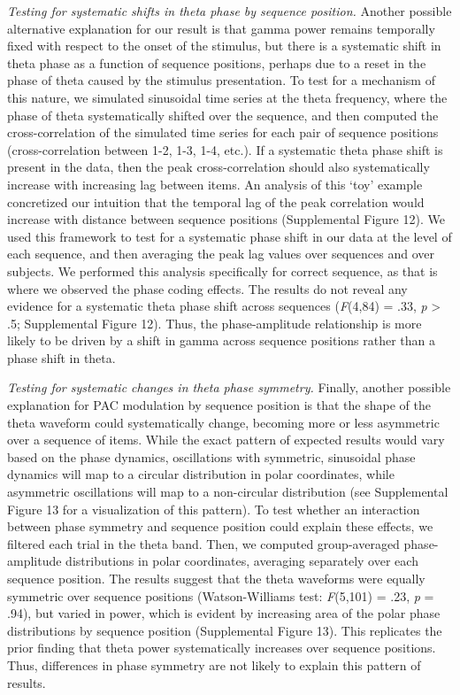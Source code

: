 \emph{Testing for systematic shifts in theta phase by sequence
position.} Another possible alternative explanation for our result is
that gamma power remains temporally fixed with respect to the onset of
the stimulus, but there is a systematic shift in theta phase as a
function of sequence positions, perhaps due to a reset in the phase of
theta caused by the stimulus presentation. To test for a mechanism of
this nature, we simulated sinusoidal time series at the theta frequency,
where the phase of theta systematically shifted over the sequence, and
then computed the cross-correlation of the simulated time series for
each pair of sequence positions (cross-correlation between 1-2, 1-3,
1-4, etc.). If a systematic theta phase shift is present in the data,
then the peak cross-correlation should also systematically increase with
increasing lag between items. An analysis of this `toy' example
concretized our intuition that the temporal lag of the peak correlation
would increase with distance between sequence positions (Supplemental
Figure 12). We used this framework to test for a systematic phase shift
in our data at the level of each sequence, and then averaging the peak
lag values over sequences and over subjects. We performed this analysis
specifically for correct sequence, as that is where we observed the
phase coding effects. The results do not reveal any evidence for a
systematic theta phase shift across sequences (\emph{F}(4,84) = .33,
\emph{p} \textgreater{} .5; Supplemental Figure 12). Thus, the
phase-amplitude relationship is more likely to be driven by a shift in
gamma across sequence positions rather than a phase shift in theta.

\emph{Testing for systematic changes in theta phase symmetry.} Finally,
another possible explanation for PAC modulation by sequence position is
that the shape of the theta waveform could systematically change,
becoming more or less asymmetric over a sequence of items. While the
exact pattern of expected results would vary based on the phase
dynamics, oscillations with symmetric, sinusoidal phase dynamics will
map to a circular distribution in polar coordinates, while asymmetric
oscillations will map to a non-circular distribution (see Supplemental
Figure 13 for a visualization of this pattern). To test whether an
interaction between phase symmetry and sequence position could explain
these effects, we filtered each trial in the theta band. Then, we
computed group-averaged phase-amplitude distributions in polar
coordinates, averaging separately over each sequence position. The
results suggest that the theta waveforms were equally symmetric over
sequence positions (Watson-Williams test: \emph{F}(5,101) = .23,
\emph{p} = .94), but varied in power, which is evident by increasing
area of the polar phase distributions by sequence position (Supplemental
Figure 13). This replicates the prior finding that theta power
systematically increases over sequence positions. Thus, differences in
phase symmetry are not likely to explain this pattern of results.

